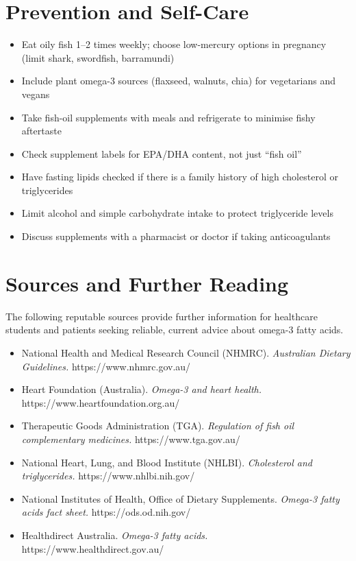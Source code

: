 \section*{Prevention and Self-Care}
\begin{itemize}
    \item Eat oily fish 1--2 times weekly; choose low-mercury options in pregnancy (limit shark, swordfish, barramundi)
    \item Include plant omega-3 sources (flaxseed, walnuts, chia) for vegetarians and vegans
    \item Take fish-oil supplements with meals and refrigerate to minimise fishy aftertaste
    \item Check supplement labels for EPA/DHA content, not just ``fish oil''
    \item Have fasting lipids checked if there is a family history of high cholesterol or triglycerides
    \item Limit alcohol and simple carbohydrate intake to protect triglyceride levels
    \item Discuss supplements with a pharmacist or doctor if taking anticoagulants
\end{itemize}

\section*{Sources and Further Reading}
The following reputable sources provide further information for healthcare students and patients seeking reliable, current advice about omega-3 fatty acids.

\begin{itemize}
    \item National Health and Medical Research Council (NHMRC). \textit{Australian Dietary Guidelines.} https://www.nhmrc.gov.au/
    \item Heart Foundation (Australia). \textit{Omega-3 and heart health.} https://www.heartfoundation.org.au/
    \item Therapeutic Goods Administration (TGA). \textit{Regulation of fish oil complementary medicines.} https://www.tga.gov.au/
    \item National Heart, Lung, and Blood Institute (NHLBI). \textit{Cholesterol and triglycerides.} https://www.nhlbi.nih.gov/
    \item National Institutes of Health, Office of Dietary Supplements. \textit{Omega-3 fatty acids fact sheet.} https://ods.od.nih.gov/
    \item Healthdirect Australia. \textit{Omega-3 fatty acids.} https://www.healthdirect.gov.au/
\end{itemize}

\clearpage
